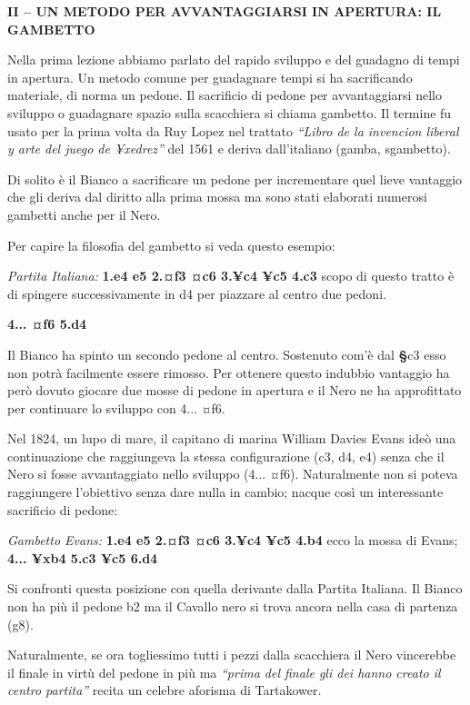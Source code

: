 \textbf{II -- UN METODO PER AVVANTAGGIARSI IN APERTURA: IL GAMBETTO}

Nella prima lezione abbiamo parlato del rapido sviluppo e del guadagno
di tempi in apertura. Un metodo comune per guadagnare tempi si ha
sacrificando materiale, di norma un pedone. Il sacrificio di pedone per
avvantaggiarsi nello sviluppo o guadagnare spazio sulla scacchiera si
chiama gambetto. Il termine fu usato per la prima volta da Ruy Lopez nel
trattato \emph{``Libro de la invencion liberal y arte del juego de
¥xedrez''} del 1561 e deriva dall'italiano (gamba, sgambetto).

Di solito è il Bianco a sacrificare un pedone per incrementare quel
lieve vantaggio che gli deriva dal diritto alla prima mossa ma sono
stati elaborati numerosi gambetti anche per il Nero.

Per capire la filosofia del gambetto si veda questo esempio:

\emph{Partita Italiana:} \textbf{1.e4 e5 2.¤f3 ¤c6 3.¥c4 ¥c5 4.c3} scopo
di questo tratto è di spingere successivamente in d4 per piazzare al
centro due pedoni.

\textbf{4... ¤f6 5.d4}


Il Bianco ha spinto un secondo pedone al centro. Sostenuto com'è dal
\textbf{§}c3 esso non potrà facilmente essere rimosso. Per ottenere
questo indubbio vantaggio ha però dovuto giocare due mosse di pedone in
apertura e il Nero ne ha approfittato per continuare lo sviluppo con
4... ¤f6.

Nel 1824, un lupo di mare, il capitano di marina William Davies Evans
ideò una continuazione che raggiungeva la stessa configurazione (c3, d4,
e4) senza che il Nero si fosse avvantaggiato nello sviluppo (4... ¤f6).
Naturalmente non si poteva raggiungere l'obiettivo senza dare nulla in
cambio; nacque così un interessante sacrificio di pedone:

\emph{Gambetto Evans:} \textbf{1.e4 e5 2.¤f3 ¤c6 3.¥c4 ¥c5 4.b4} ecco la
mossa di Evans; \textbf{4... ¥xb4 5.c3 ¥c5 6.d4}


Si confronti questa posizione con quella derivante dalla Partita
Italiana. Il Bianco non ha più il pedone b2 ma il Cavallo nero si trova
ancora nella casa di partenza (g8).

Naturalmente, se ora togliessimo tutti i pezzi dalla scacchiera il Nero
vincerebbe il finale in virtù del pedone in più ma \emph{``prima del
finale gli dei hanno creato il centro partita''} recita un celebre
aforisma di Tartakower.

